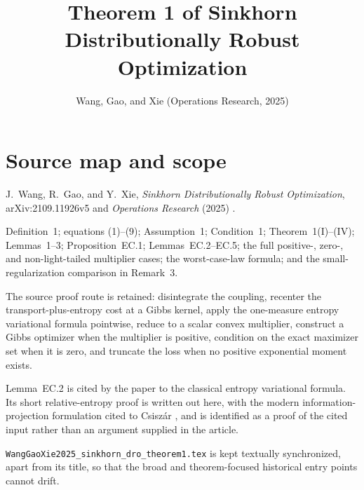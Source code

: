 
\title{Theorem 1 of Sinkhorn Distributionally Robust Optimization}
\author{}
\date{Wang, Gao, and Xie (Operations Research, 2025)}

\maketitle

\section*{Source map and scope}
\begin{sourceguide}
\item[Primary source] J.~Wang, R.~Gao, and Y.~Xie, \emph{Sinkhorn Distributionally Robust Optimization}, arXiv:2109.11926v5 and \emph{Operations Research} (2025) \cite{WangGaoXie2025}.
\item[Coverage] Definition~1; equations (1)--(9); Assumption~1; Condition~1; Theorem~1(I)--(IV); Lemmas~1--3; Proposition~EC.1; Lemmas~EC.2--EC.5; the full positive-, zero-, and non-light-tailed multiplier cases; the worst-case-law formula; and the small-regularization comparison in Remark~3.
\item[Method] The source proof route is retained: disintegrate the coupling, recenter the transport-plus-entropy cost at a Gibbs kernel, apply the one-measure entropy variational formula pointwise, reduce to a scalar convex multiplier, construct a Gibbs optimizer when the multiplier is positive, condition on the exact maximizer set when it is zero, and truncate the loss when no positive exponential moment exists.
\item[Supplemental detail] Lemma~EC.2 is cited by the paper to the classical entropy variational formula.  Its short relative-entropy proof is written out here, with the modern information-projection formulation cited to Csisz\'ar \cite{Csiszar1975}, and is identified as a proof of the cited input rather than an argument supplied in the article.
\item[Companion note] \texttt{WangGaoXie2025\_sinkhorn\_dro\_theorem1.tex} is kept textually synchronized, apart from its title, so that the broad and theorem-focused historical entry points cannot drift.
\end{sourceguide}

